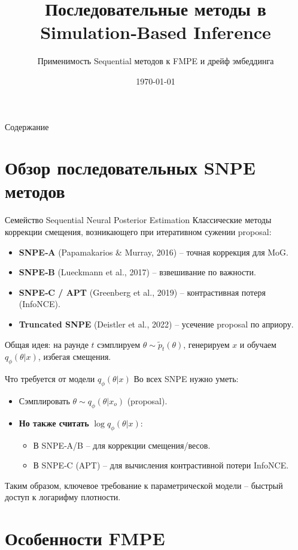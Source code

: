 \documentclass[10pt,aspectratio=169]{beamer}
\title{Последовательные методы в Simulation‑Based Inference}
\subtitle{Применимость Sequential методов к FMPE и дрейф эмбеддинга}
\date{\today}
\begin{document}
\frame{\titlepage}

\begin{frame}{Содержание}
\tableofcontents
\end{frame}

\section{Обзор последовательных SNPE методов}

\begin{frame}{Семейство Sequential Neural Posterior Estimation}
Классические методы коррекции смещения, возникающего при итеративном сужении proposal:
\begin{itemize}
    \item \textbf{SNPE‑A} (Papamakarios \& Murray, 2016) – точная коррекция для MoG.
    \item \textbf{SNPE‑B} (Lueckmann et al., 2017) – взвешивание по важности.
    \item \textbf{SNPE‑C / APT} (Greenberg et al., 2019) – контрастивная потеря (InfoNCE).
    \item \textbf{Truncated SNPE} (Deistler et al., 2022) – усечение proposal по априору.
\end{itemize}
\pause
Общая идея: на раунде $t$ сэмплируем $\theta \sim \tilde{p}_t(\theta)$, генерируем $x$ и обучаем $q_\phi(\theta|x)$, избегая смещения.
\end{frame}

\begin{frame}{Что требуется от модели $q_\phi(\theta|x)$}
Во всех SNPE нужно уметь:
\begin{itemize}
    \item Сэмплировать $\theta \sim q_\phi(\theta|x_o)$ (proposal).
    \item \textbf{Но также считать} $\log q_\phi(\theta|x)$:
    \begin{itemize}
        \item В SNPE‑A/B – для коррекции смещения/весов.
        \item В SNPE‑C (APT) – для вычисления контрастивной потери InfoNCE.
    \end{itemize}
\end{itemize}
\pause
Таким образом, ключевое требование к параметрической модели – быстрый доступ к логарифму плотности.
\end{frame}

\section{Особенности FMPE}
\end{document}
